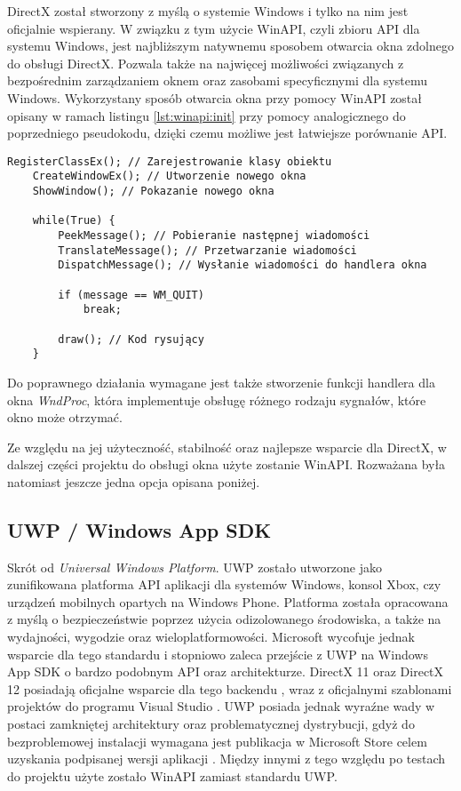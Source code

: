 DirectX został stworzony z myślą o systemie Windows i tylko na nim jest
oficjalnie wspierany. W związku z tym użycie WinAPI, czyli zbioru API
dla systemu Windows, jest najbliższym natywnemu sposobem otwarcia okna
zdolnego do obsługi DirectX. Pozwala także na najwięcej możliwości
związanych z bezpośrednim zarządzaniem oknem oraz zasobami specyficznymi
dla systemu Windows. Wykorzystany sposób otwarcia okna przy pomocy WinAPI został opisany
w ramach listingu \ref{lst:winapi:init} przy pomocy analogicznego do poprzedniego pseudokodu, dzięki czemu możliwe jest łatwiejsze porównanie API.

\begin{lstlisting}[caption={Pseudokod inicjalizacji okna WinAPI (oryginalna treść)}, label={lst:winapi:init}]
	RegisterClassEx(); // Zarejestrowanie klasy obiektu
	CreateWindowEx(); // Utworzenie nowego okna
	ShowWindow(); // Pokazanie nowego okna
	
	while(True) {
		PeekMessage(); // Pobieranie następnej wiadomości
		TranslateMessage(); // Przetwarzanie wiadomości
		DispatchMessage(); // Wysłanie wiadomości do handlera okna
	
		if (message == WM_QUIT)
			break;
		
		draw(); // Kod rysujący
	}
\end{lstlisting}

Do poprawnego działania wymagane jest także stworzenie funkcji handlera
dla okna \emph{WndProc}, która implementuje obsługę różnego rodzaju
sygnałów, które okno może otrzymać. 

Ze względu na jej użyteczność, stabilność oraz najlepsze wsparcie dla
DirectX, w dalszej części projektu do obsługi okna użyte zostanie WinAPI. Rozważana była natomiast jeszcze jedna opcja opisana poniżej.

\subsection{UWP / Windows App SDK}

Skrót od \emph{Universal Windows Platform}. UWP zostało utworzone jako
zunifikowana platforma API aplikacji dla systemów Windows, konsol Xbox,
czy urządzeń mobilnych opartych na Windows Phone. Platforma została
opracowana z myślą o bezpieczeństwie poprzez użycia odizolowanego
środowiska, a także na wydajności, wygodzie oraz wieloplatformowości. Microsoft wycofuje jednak wsparcie dla tego standardu i
stopniowo zaleca przejście z UWP na Windows App SDK o bardzo
podobnym API oraz architekturze. DirectX 11 oraz DirectX 12 posiadają oficjalne wsparcie dla tego
backendu \cite{ms:dxuwp:2024}, wraz z oficjalnymi szablonami projektów do programu
Visual Studio \cite{ms:dxuwpui:2024}. UWP posiada jednak wyraźne wady w postaci zamkniętej architektury oraz
problematycznej dystrybucji, gdyż do bezproblemowej instalacji wymagana
jest publikacja w Microsoft Store celem uzyskania podpisanej wersji
aplikacji \cite{ms:uwppackaging:2024}. Między innymi z tego względu po testach do projektu użyte zostało WinAPI
zamiast standardu UWP.

